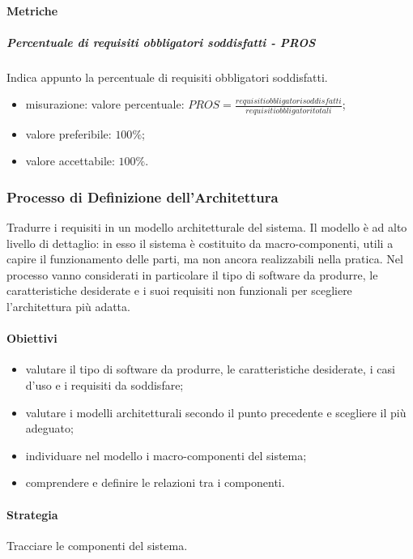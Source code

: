 		\paragraph{Metriche}
			\subparagraph{Percentuale di requisiti obbligatori soddisfatti - PROS} Indica appunto la percentuale di requisiti obbligatori soddisfatti.
			\begin{itemize}
				\item misurazione: valore percentuale: $ PROS = \frac{requisiti obbligatori soddisfatti}{requisiti obbligatori totali}$;
				\item valore preferibile: $100\%$;
				\item valore accettabile: $100\%$.
			\end{itemize}
		
	\subsubsection{Processo di Definizione dell'Architettura}
	Tradurre i requisiti in un modello architetturale del sistema.
	Il modello è ad alto livello di dettaglio: in esso il sistema è costituito da macro-componenti, utili a capire il funzionamento delle parti, ma non ancora realizzabili nella pratica.\newline
	Nel processo vanno considerati in particolare il tipo di software da produrre, le caratteristiche desiderate e i suoi requisiti non funzionali per scegliere l'architettura più adatta.
		\paragraph{Obiettivi}
		\begin{itemize}
			\item valutare il tipo di software da produrre, le caratteristiche desiderate, i casi d'uso e i requisiti da soddisfare;
			\item valutare i modelli architetturali secondo il punto precedente e scegliere il più adeguato;
			\item individuare nel modello i macro-componenti del sistema;
			\item comprendere e definire le relazioni tra i componenti.
		\end{itemize}
		\paragraph{Strategia}
		Tracciare le componenti del sistema.
